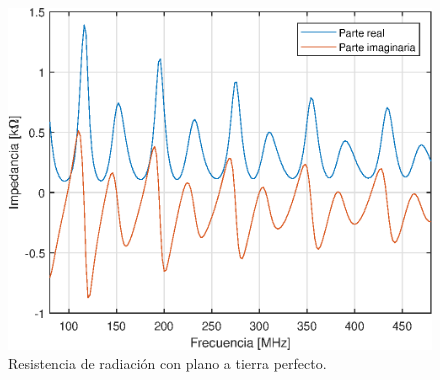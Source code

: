 \begin{figure}[H]
	\centering
	\includegraphics{imagenes/z_tierra.eps}
	\caption{Resistencia de radiación con plano a tierra perfecto.}
	\label{fig.z_radiacion}
\end{figure}